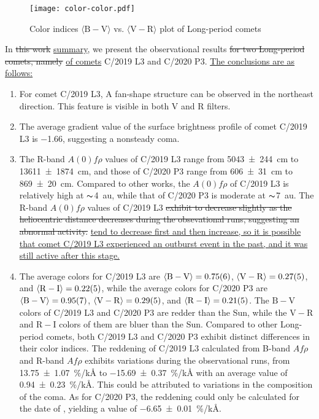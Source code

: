 
\begin{figure}
    \centering
    \texttt{[image: color-color.pdf]}
    \caption{Color indices $\langle \mathrm{B} - \mathrm{V} \rangle$ vs. $\langle \mathrm{V} - \mathrm{R} \rangle$ plot of Long-period comets}\label{fig:color-color}
\end{figure}

In \st{this work} \ul{summary}, we present the observational results \st{for two Long-period comets, namely} \ul{of comets} C/2019 L3 and C/2020 P3. \ul{The conclusions are as follows: }
\begin{enumerate}
    \item For comet C/2019 L3, A fan-shape structure can be observed in the northeast direction. This feature is visible in both V and R filters. 
    \item The average gradient value  of the surface brightness profile of comet C/2019 L3 is \num{-1.66}, suggesting a nonsteady coma. 
    \item The R-band $A(0)f\rho$ values of C/2019 L3 range from {\qty{5043 +- 244}{\cm}} to {\qty{13611 +- 1874}{\cm}}, and those of C/2020 P3 range from {\qty{606 +- 31}{\cm}} to {\qty{869 +- 20}{\cm}}. Compared to other works, the $A(0)f\rho$ of C/2019 L3 is relatively high at $\thicksim${\qty{4}{\astronomicalunit}}, while that of C/2020 P3 is moderate at $\thicksim${\SI{7}{\astronomicalunit}}. The R-band $A(0)f\rho$ values of C/2019 L3 \st{exhibit to decrease slightly as the heliocentric distance decreases during the obsevational runs, suggesting an abnormal activity.} \ul{tend to decrease first and then increase, so it is possible that comet C/2019 L3 experienced an outburst event in the past, and it was still active after this stage. }
    \item The average colors for C/2019 L3 are  
        $\langle \mathrm{B} - \mathrm{V} \rangle = \num{0.75 +- 0.06}$, 
        $\langle \mathrm{V} - \mathrm{R} \rangle = \num{0.27 +- 0.05}$, and 
        $\langle \mathrm{R} - \mathrm{I} \rangle = \num{0.22 +- 0.05}$,  
        while the average colors for C/2020 P3 are 
        $\langle \mathrm{B} - \mathrm{V} \rangle = \num{0.95 +- 0.07}$, 
        $\langle \mathrm{V} - \mathrm{R} \rangle = \num{0.29 +- 0.05}$, and 
        $\langle \mathrm{R} - \mathrm{I} \rangle = \num{0.21 +- 0.05}$. 
        The $\mathrm{B} - \mathrm{V}$ colors of C/2019 L3 and C/2020 P3 are redder than the Sun, while the $\mathrm{V} - \mathrm{R}$ and $\mathrm{R} - \mathrm{I}$ colors of them are bluer than the Sun. Compared to other Long-period comets, both C/2019 L3 and C/2020 P3 exhibit distinct differences in their color indices. The reddening of C/2019 L3 calculated from B-band $Af\rho$ and R-band $Af\rho$ exhibits variations during the observational runs, from {\qty{13.75 +- 1.07}{\percent/\kilo\angstrom}} to {\qty{-15.69 +- 0.37}{\percent/\kilo\angstrom}} with an average value of {\qty{0.94 +- 0.23}{\percent/\kilo\angstrom}}. This could be attributed to  variations in the composition of the coma. As for C/2020 P3, the reddening could only be calculated for the date of , yielding a value of {\qty{-6.65 +- 0.01}{\percent/\kilo\angstrom}}. 
\end{enumerate}
